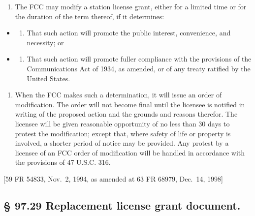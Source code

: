 \documentclass[
  letterpaper,
  DIV=11,
  numbers=noendperiod]{scrreport}
\providecommand{\tightlist}{%
  \setlength{\itemsep}{0pt}\setlength{\parskip}{0pt}}\usepackage{longtable,booktabs,array}
\begin{document}
\begin{enumerate}
\def\labelenumi{(\alph{enumi})}
\tightlist
\item
  The FCC may modify a station license grant, either for a limited time
  or for the duration of the term thereof, if it determines:
\end{enumerate}

\begin{itemize}
\item
  \begin{enumerate}
  \def\labelenumi{(\arabic{enumi})}
  \tightlist
  \item
    That such action will promote the public interest, convenience, and
    necessity; or
  \end{enumerate}
\item
  \begin{enumerate}
  \def\labelenumi{(\arabic{enumi})}
  \setcounter{enumi}{1}
  \tightlist
  \item
    That such action will promote fuller compliance with the provisions
    of the Communications Act of 1934, as amended, or of any treaty
    ratified by the United States.
  \end{enumerate}
\end{itemize}

\begin{enumerate}
\def\labelenumi{(\alph{enumi})}
\setcounter{enumi}{1}
\tightlist
\item
  When the FCC makes such a determination, it will issue an order of
  modification. The order will not become final until the licensee is
  notified in writing of the proposed action and the grounds and reasons
  therefor. The licensee will be given reasonable opportunity of no less
  than 30 days to protest the modification; except that, where safety of
  life or property is involved, a shorter period of notice may be
  provided. Any protest by a licensee of an FCC order of modification
  will be handled in accordance with the provisions of 47 U.S.C. 316.
\end{enumerate}

{[}59 FR 54833, Nov.~2, 1994, as amended at 63 FR 68979, Dec.~14,
1998{]}

\hypertarget{replacement-license-grant-document.}{%
\subsection*{§ 97.29 Replacement license grant
document.}\label{replacement-license-grant-document.}}
\end{document}

